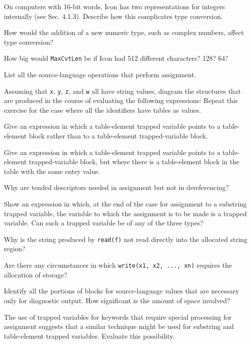  On computers with 16-bit words, Icon has two
representations for integers internally (see Sec. 4.1.3). Describe how
this complicates type conversion.

 How would the addition of a new numeric type,
such as complex numbers, affect type conversion?

 How big would \texttt{MaxCvtLen} be if Icon had 512
different characters?  128? 64?

 List all the source-language operations that
perform assignment.

 Assuming that \texttt{x}, \texttt{y}, \texttt{z},
and \texttt{w} all have string values, diagram the structures that are
produced in the course of evaluating the following expressions:
Repeat this exercise for the case where all the identifiers have tables as values.

 Give an expression in which a table-element
trapped variable points to a table-element block rather than to a
table-element trapped-variable block.

 Give an expression in which a table-element
trapped variable points to a table-element trapped-variable block, but
where there is a table-element block in the table with the same entry
value.

Why are tended descriptors needed in assignment but not in dereferencing?

 Show an expression in which, at the end of the case for
assignment to a substring trapped variable, the variable to which the
assignment is to be made is a trapped variable. Can such a trapped
variable be of any of the three types?

 Why is the string produced by \texttt{read(f)}
not read directly into the allocated string region?

 Are there any circumstances in which
\texttt{write(x1, x2, ..., xn)} requires the allocation of storage?

 Identify all the portions of blocks for
source-language values that are necessary only for diagnostic
output. How significant is the amount of space involved?

 The use of trapped variables for keywords that
require special processing for assignment suggests that a similar
technique might be used for substring and table-element trapped
variables. Evaluate this possibility.
